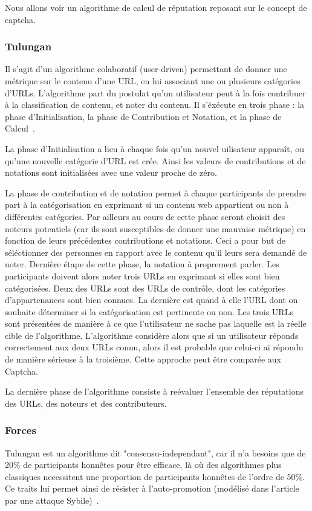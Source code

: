 \documentclass[a4paper, 11pt]{article} %
\begin{document}
Nous allons voir un algorithme de calcul de réputation reposant sur le concept de captcha.

\subsubsection{Tulungan}
Il s'agit d'un algorithme colaboratif (user-driven) permettant de donner une métrique sur le contenu d'une URL, en lui associant une ou plusieurs catégories d'URLs.
L'algorithme part du postulat qu'un utilisateur peut à la fois contribuer à la classification de contenu, et noter du contenu.
Il s'éxécute en trois phase : la phase d'Initialisation, la phase de Contribution et Notation, et la phase de Calcul~\cite{Tulungan2013}.

La phase d'Initialisation a lieu à chaque fois qu'un nouvel uilisateur apparaît, ou qu'une nouvelle catégorie d'URL est crée.
Ainsi les valeurs de contributions et de notations sont initialisées avec une valeur proche de zéro.

La phase de contribution et de notation permet à chaque participants de prendre part à la catégorisation en exprimant si un contenu web appartient ou non à différentes catégories.
Par ailleurs au cours de cette phase seront choisit des noteurs potentiels (car ils sont susceptibles de donner une mauvaise métrique) en fonction de leurs précédentes contributions et notations.
Ceci a pour but de séléctionner des personnes en rapport avec le contenu qu'il leurs sera demandé de noter.
Dernière étape de cette phase, la notation à proprement parler. Les participants doivent alors noter trois URLs en exprimant si elles sont bien catégorisées.
Deux des URLs sont des URLs de contrôle, dont les catégories d'appartenances sont bien connues.
La dernière est quand à elle l'URL dont on souhaite déterminer si la catégorisation est pertinente ou non.
Les trois URLs sont présentées de manière à ce que l'utilisateur ne sache pas laquelle est la réelle cible de l'algorithme.
L'algorithme considère alors que si un utilisateur réponds correctement aux deux URLs connu, alors il est probable que celui-ci ai répondu de manière sérieuse à la troisième.
Cette approche peut être comparée aux Captcha.

La dernière phase de l'algorithme consiste à reévaluer l'ensemble des réputations des URLs, des noteurs et des contributeurs.

\subsubsection{Forces}
Tulungan est un algorithme dit "consensu-independant", car il n'a besoins que de 20\% de participants honnêtes pour être efficace, là où des algorithmes plus classiques necessitent une proportion de participants honnêtes de l'ordre de 50\%.
Ce traits lui permet ainsi de résister à l'auto-promotion (modélisé dans l'article par une attaque Sybile)~\cite{Tulungan2013}.
\end{document}
